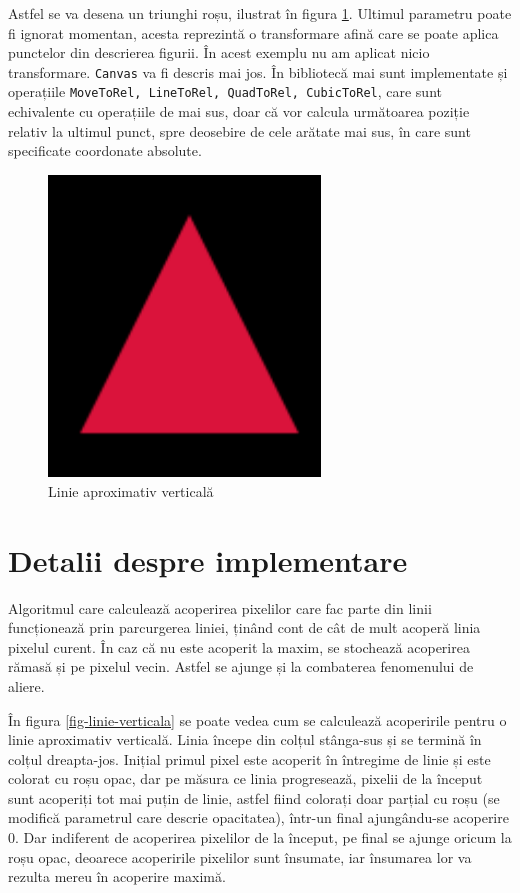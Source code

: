 \documentclass[a4paper, 12pt]{report}
\begin{document}
Astfel se va desena un triunghi roșu, ilustrat în figura \ref{fig-triunghi-simplu}. Ultimul parametru poate fi ignorat momentan, acesta reprezintă o
transformare afină care se poate aplica punctelor din descrierea figurii. În acest exemplu nu am aplicat nicio transformare.
\texttt{Canvas} va fi descris mai jos. În bibliotecă mai sunt implementate și operațiile \texttt{MoveToRel, LineToRel, QuadToRel, CubicToRel},
care sunt echivalente cu operațiile de mai sus, doar că vor calcula următoarea poziție relativ la ultimul punct, spre deosebire de cele arătate
mai sus, în care sunt specificate coordonate absolute.

\begin{figure}[ht]
    \includegraphics[height=8cm]{triunghi_simplu.png}
    \centering
    \caption{Linie aproximativ verticală}
    \label{fig-triunghi-simplu}
\end{figure}

\section{Detalii despre implementare}

Algoritmul care calculează acoperirea pixelilor care fac parte din linii funcționează prin parcurgerea liniei, ținând cont
de cât de mult acoperă linia pixelul curent. În caz că nu este acoperit la maxim, se stochează acoperirea rămasă și pe
pixelul vecin. Astfel se ajunge și la combaterea fenomenului de aliere.

În figura \ref{fig-linie-verticala} se poate vedea cum se calculează acoperirile pentru o linie aproximativ verticală.
Linia începe din colțul stânga-sus și se termină în colțul dreapta-jos. Inițial primul pixel este acoperit în întregime
de linie și este colorat cu roșu opac, dar pe măsura ce linia progresează, pixelii de la început sunt acoperiți tot mai puțin
de linie, astfel fiind colorați doar parțial cu roșu (se modifică parametrul care descrie opacitatea), într-un final ajungându-se
acoperire 0. Dar indiferent de acoperirea pixelilor de la început, pe final se ajunge oricum la roșu opac, deoarece acoperirile pixelilor
sunt însumate, iar însumarea lor va rezulta mereu în acoperire maximă.
\end{document}
